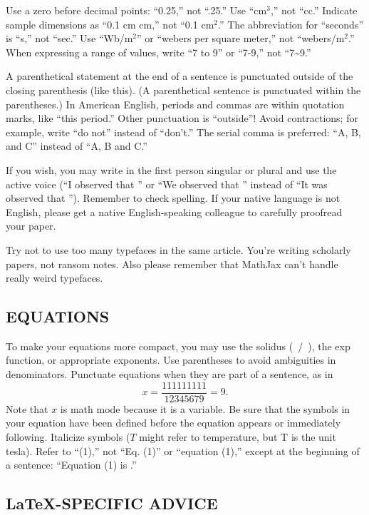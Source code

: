 \documentclass{IEEEoj}
\begin{document}
Use a zero before decimal points: ``0.25,'' not ``.25.'' Use ``cm$^3$,'' not 
``cc.'' Indicate sample dimensions as ``0.1 cm  cm,'' not 
``0.1  cm$^{2}$.'' The abbreviation for ``seconds'' is ``s,'' 
not ``sec.'' Use ``Wb/m$^{2}$'' or ``webers per square meter,'' not 
``webers/m$^2$.'' When expressing a range of values, write ``7 to 9'' or 
``7-9,'' not ``7\textasciitilde 9.''

A parenthetical statement at the end of a sentence is punctuated outside of 
the closing parenthesis (like this). (A parenthetical sentence is punctuated 
within the parentheses.) In American English, periods and commas are within 
quotation marks, like ``this period.'' Other punctuation is ``outside''! 
Avoid contractions; for example, write ``do not'' instead of ``don't.'' The 
serial comma is preferred: ``A, B, and C'' instead of ``A, B and C.''

If you wish, you may write in the first person singular or plural and use 
the active voice (``I observed that \textellipsis'' or ``We observed that \textellipsis'' 
instead of ``It was observed that \textellipsis''). Remember to check spelling. If 
your native language is not English, please get a native English-speaking 
colleague to carefully proofread your paper.

Try not to use too many typefaces in the same article. You're writing
scholarly papers, not ransom notes. Also please remember that MathJax
can't handle really weird typefaces.

\subsection{EQUATIONS}
To make your equations more 
compact, you may use the solidus (~/~), the exp function, or appropriate 
exponents. Use parentheses to avoid ambiguities in denominators. Punctuate 
equations when they are part of a sentence, as in
\begin{equation}
\label{eq1}
x=\frac{111111111}{12345679}=9 .
\end{equation}
Note that $x$ is math mode because it is a variable. 
Be sure that the symbols in your equation have been defined before the 
equation appears or immediately following. Italicize symbols ($T$ might refer 
to temperature, but T is the unit tesla). Refer to ``(1),'' not ``Eq. (1)'' 
or ``equation (1),'' except at the beginning of a sentence: ``Equation (1) 
is \textellipsis .''

\subsection{\LaTeX-SPECIFIC ADVICE}
\end{document}
